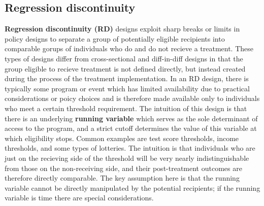\subsection{Regression discontinuity}

\textbf{Regression discontinuity (RD)} designs exploit sharp breaks or limits
in policy designs to separate a group of potentially eligible recipients
into comparable gorups of individuals who do and do not recieve a treatment.
These types of designs differ from cross-sectional and diff-in-diff designs
in that the group eligible to recieve treatment is not defined directly,
but instead created during the process of the treatment implementation.
In an RD design, there is typically some program or event
which has limited availability due to practical considerations or poicy choices
and is therefore made available only to individuals who meet a certain threshold requirement.
The intuition of this design is that there is an underlying \textbf{running variable}
which serves as the sole determinant of access to the program,
and a strict cutoff determines the value of this variable at which eligibility stops.\cite{imbens2008regression}
Common examples are test score thresholds, income thresholds, and some types of lotteries.
The intuition is that individuals who are just on the recieving side of the threshold
will be very nearly indistinguishable from those on the non-receiving side,
and their post-treatment outcomes are therefore directly comparable.\cite{lee2010regression}
The key assumption here is that the running variable cannot be directly manipulated
by the potential recipients; if the running variable is time there are special considerations.\cite{hausman2018regression}

